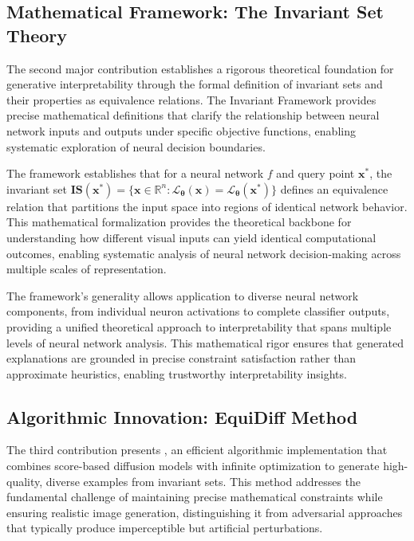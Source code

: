 \subsection{Mathematical Framework: The Invariant Set Theory}

The second major contribution establishes a rigorous theoretical foundation for generative interpretability through the formal definition of invariant sets and their properties as equivalence relations. The Invariant Framework provides precise mathematical definitions that clarify the relationship between neural network inputs and outputs under specific objective functions, enabling systematic exploration of neural decision boundaries.

The framework establishes that for a neural network $f$ and query point $\mathbf{x^*}$, the invariant set $\mathbf{IS}(\mathbf{x^*}) = \{ \mathbf{x} \in \mathbb{R}^n : \mathcal{L}_{\boldsymbol{\theta}}(\mathbf{x}) = \mathcal{L}_{\boldsymbol{\theta}}(\mathbf{x^*}) \}$ defines an equivalence relation that partitions the input space into regions of identical network behavior. This mathematical formalization provides the theoretical backbone for understanding how different visual inputs can yield identical computational outcomes, enabling systematic analysis of neural network decision-making across multiple scales of representation.

The framework's generality allows application to diverse neural network components, from individual neuron activations to complete classifier outputs, providing a unified theoretical approach to interpretability that spans multiple levels of neural network analysis. This mathematical rigor ensures that generated explanations are grounded in precise constraint satisfaction rather than approximate heuristics, enabling trustworthy interpretability insights.

\subsection{Algorithmic Innovation: EquiDiff Method}

The third contribution presents \method{}, an efficient algorithmic implementation that combines score-based diffusion models with infinite optimization to generate high-quality, diverse examples from invariant sets. This method addresses the fundamental challenge of maintaining precise mathematical constraints while ensuring realistic image generation, distinguishing it from adversarial approaches that typically produce imperceptible but artificial perturbations.

